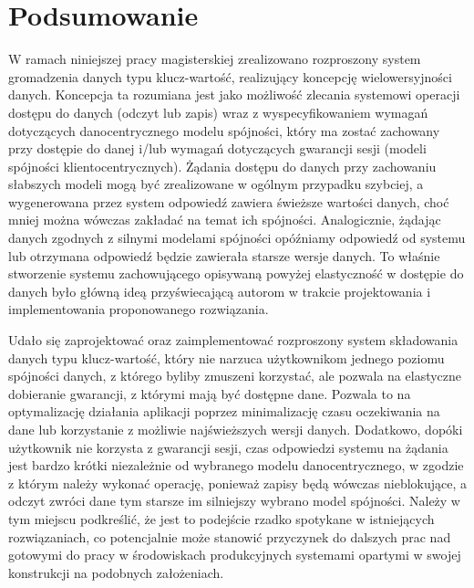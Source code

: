 \chapter{Podsumowanie} \label{chapter:summary}

W ramach niniejszej pracy magisterskiej zrealizowano rozproszony system gromadzenia danych typu klucz-wartość, realizujący koncepcję wielowersyjności danych. Koncepcja ta rozumiana jest jako możliwość zlecania systemowi operacji dostępu do danych (odczyt lub zapis) wraz z wyspecyfikowaniem wymagań dotyczących danocentrycznego modelu spójności, który ma zostać zachowany przy dostępie do danej i/lub wymagań dotyczących gwarancji sesji (modeli spójności klientocentrycznych). Żądania dostępu do danych przy zachowaniu słabszych modeli mogą być zrealizowane w ogólnym przypadku szybciej, a wygenerowana przez system odpowiedź zawiera świeższe wartości danych, choć mniej można wówczas zakładać na temat ich spójności. Analogicznie, żądając danych zgodnych z silnymi modelami spójności opóźniamy odpowiedź od systemu lub otrzymana odpowiedź będzie zawierała starsze wersje danych. To właśnie stworzenie systemu zachowującego opisywaną powyżej elastyczność w dostępie do danych było główną ideą przyświecającą autorom w trakcie projektowania i implementowania proponowanego rozwiązania.

Udało się zaprojektować oraz zaimplementować rozproszony system składowania danych typu klucz-wartość, który nie narzuca użytkownikom jednego poziomu spójności danych, z którego byliby zmuszeni korzystać, ale pozwala na elastyczne dobieranie gwarancji, z którymi mają być dostępne dane. Pozwala to na optymalizację działania aplikacji poprzez minimalizację czasu oczekiwania na dane lub korzystanie z możliwie najświeższych wersji danych. Dodatkowo, dopóki użytkownik nie korzysta z gwarancji sesji, czas odpowiedzi systemu na żądania jest bardzo krótki niezależnie od wybranego modelu danocentrycznego, w zgodzie z którym należy wykonać operację, ponieważ zapisy będą wówczas nieblokujące, a odczyt zwróci dane tym starsze im silniejszy wybrano model spójności. Należy w tym miejscu podkreślić, że jest to podejście rzadko spotykane w istniejących rozwiązaniach, co potencjalnie może stanowić przyczynek do dalszych prac nad gotowymi do pracy w środowiskach produkcyjnych systemami opartymi w swojej konstrukcji na podobnych założeniach.

